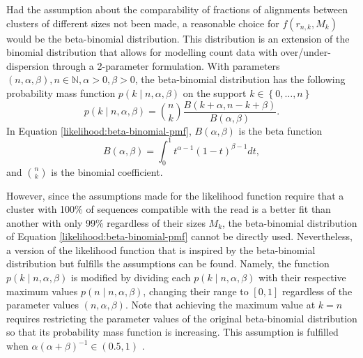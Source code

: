 \documentclass[officiallayout]{tktla}
\begin{document}
Had the assumption about the comparability of fractions of
alignments between clusters of different sizes not been made, a reasonable choice
for $f\left(r_{n, k}, M_{k}\right)$ would be the beta-binomial
distribution. This distribution is an extension of the binomial
distribution that allows for modelling count data with
over/under-dispersion through a 2-parameter formulation. With
parameters $\left(n, \alpha, \beta\right), n \in \mathbb{N}, \alpha >
0, \beta > 0$, the beta-binomial distribution has the following
probability mass function $p\left(k \middle| n, \alpha, \beta\right)$
on the support $k \in \left\{0, \dots, n\right\}$
\begin{equation}
  \label{likelihood:beta-binomial-pmf}
  p\left(k \middle| n, \alpha, \beta\right) = \binom{n}{k}\frac{B\left(k + \alpha, n - k + \beta\right)}{B\left(\alpha, \beta\right)}.
\end{equation}
In Equation \eqref{likelihood:beta-binomial-pmf}, $B\left(\alpha, \beta\right)$ is the beta function
\begin{equation}
  \label{likelihood:beta-function}
  B\left(\alpha, \beta\right) = \int_{0}^{1}t^{\alpha - 1}\left(1 - t\right)^{\beta - 1}dt,
\end{equation}
and $\binom{n}{k}$ is the binomial coefficient.

However, since the assumptions made for the likelihood function
require that a cluster with 100\% of sequences compatible with the
read is a better fit than another with only 99\% regardless of their
sizes $M_{k}$, the beta-binomial distribution of Equation
\eqref{likelihood:beta-binomial-pmf} cannot be directly
used. Nevertheless, a version of the likelihood function that is
inspired by the beta-binomial distribution but fulfills the
assumptions can be found. Namely, the function $p\left(k \middle| n,
\alpha, \beta\right)$ is modified by dividing each $p\left(k \middle|
n, \alpha, \beta\right)$ with their respective maximum values
$p\left(n \middle| n, \alpha, \beta\right)$, changing their range to
$\left[0, 1\right]$ regardless of the parameter values $\left(n,
\alpha, \beta \right)$. Note that achieving the maximum value at $k =
n$ requires restricting the parameter values of the original
beta-binomial distribution so that its probability mass function is
increasing. This assumption is fulfilled when $\alpha\left(\alpha +
\beta\right)^{-1} \in \left(0.5, 1\right)$ \citep{berg1993condorcet}.
\end{document}
